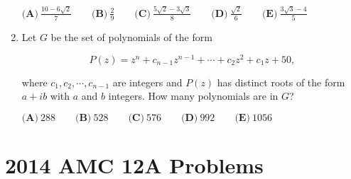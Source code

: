 \documentclass{article}
\begin{document}
\begin{enumerate}[label=\arabic*., itemsep=0.5em]
\(\textbf{(A)}\  \frac{10-6\sqrt{2}}{7} \qquad \textbf{(B)}\ \frac{2}{9} \qquad \textbf{(C)}\ \frac{5\sqrt{2}-3\sqrt{3}}{8} \qquad \textbf{(D)}\ \frac{\sqrt{2}}{6} \qquad \textbf{(E)}\ \frac{3\sqrt{3}-4}{5}\)\par \vspace{0.5em}\item Let \(G\) be the set of polynomials of the form

\begin{equation*}
P(z)=z^n+c_{n-1}z^{n-1}+\cdots+c_2z^2+c_1z+50,
\end{equation*}

where \( c_1,c_2,\cdots, c_{n-1} \) are integers and \(P(z)\) has distinct roots of the form \(a+ib\) with \(a\) and \(b\) integers. How many polynomials are in \(G\)?

\( \textbf{(A)}\ 288\qquad\textbf{(B)}\ 528\qquad\textbf{(C)}\ 576\qquad\textbf{(D)}\ 992\qquad\textbf{(E)}\ 1056 \)\par \vspace{0.5em}\end{enumerate}\newpage\section*{2014 AMC 12A Problems}
\end{document}
